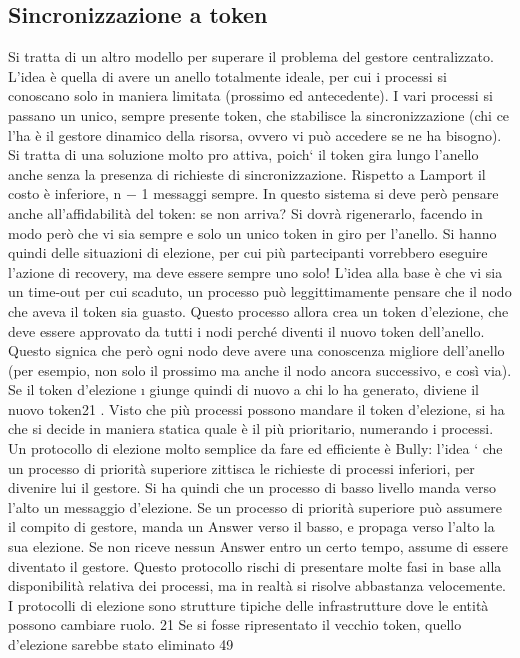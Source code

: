 \subsection{Sincronizzazione a token}
Si tratta di un altro modello per superare il problema del gestore centralizzato. L'idea è quella di avere un anello
totalmente ideale, per cui i processi si
conoscano solo in maniera limitata (prossimo ed antecedente). I vari processi
si passano un unico, sempre presente token, che stabilisce la sincronizzazione
(chi ce l'ha è il gestore dinamico della risorsa, ovvero vi può accedere se ne
ha bisogno). Si tratta di una soluzione molto pro attiva, poich` il token gira
lungo l'anello anche senza la presenza di richieste di sincronizzazione. Rispetto
a Lamport il costo è inferiore, n $-$ 1 messaggi sempre.
In questo sistema si deve però pensare anche all'affidabilità del token: se
non arriva? Si dovrà rigenerarlo, facendo in modo però che vi sia sempre e solo
un unico token in giro per l'anello. Si hanno quindi delle situazioni di elezione,
per cui più partecipanti vorrebbero eseguire l'azione di recovery, ma deve essere
sempre uno solo! L'idea alla base è che vi sia un time-out per cui scaduto, un
processo può leggittimamente pensare che il nodo che aveva il token sia guasto.
Questo processo allora crea un token d'elezione, che deve essere approvato da
tutti i nodi perché diventi il nuovo token dell'anello. Questo signica che però
ogni nodo deve avere una conoscenza migliore dell'anello (per esempio, non solo
il prossimo ma anche il nodo ancora successivo, e così via). Se il token d'elezione
\i{}
giunge quindi di nuovo a chi lo ha generato, diviene il nuovo token21 . Visto che
più processi possono mandare il token d'elezione, si ha che si decide in maniera
statica quale è il più prioritario, numerando i processi.
Un protocollo di elezione molto semplice da fare ed efficiente è Bully: l'idea
` che un processo di priorità superiore zittisca le richieste di processi inferiori,
per divenire lui il gestore. Si ha quindi che un processo di basso livello manda
verso l'alto un messaggio d'elezione. Se un processo di priorità superiore può
assumere il compito di gestore, manda un Answer verso il basso, e propaga verso
l'alto la sua elezione. Se non riceve nessun Answer entro un certo tempo, assume
di essere diventato il gestore. Questo protocollo rischi di presentare molte fasi
in base alla disponibilità relativa dei processi, ma in realtà si risolve abbastanza
velocemente. I protocolli di elezione sono strutture tipiche delle infrastrutture
dove le entità possono cambiare ruolo.
21 Se
si fosse ripresentato il vecchio token, quello d'elezione sarebbe stato eliminato
49
